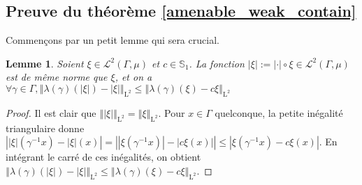 \documentclass[a4paper,12pt]{article}
\newtheorem{lemma}[theorem]{Lemme}
\newcommand{\norm}[1]{\left\Vert #1\right\Vert}
\newcommand{\abs}[1]{\left\vert#1\right\vert}
\newcommand{\inv}{^{-1}}
\newcommand{\comp}{\circ}
\begin{document}
\subsection{Preuve du théorème \ref{amenable_weak_contain}}

Commençons par un petit lemme qui sera crucial.

\begin{lemma}\label{abs_trick}
    Soient $\xi\in\mathscr{L}^2(\Gamma, \mu)$ et $c\in\mathbb{S}_1$. La fonction $\abs{\xi} := \abs{\cdot}\comp\xi \in\mathscr{L}^2(\Gamma, \mu)$ est de même norme 
    que $\xi$, et on a $\forall\gamma\in\Gamma, \norm{\lambda(\gamma)(\abs{\xi}) - \abs{\xi}}_{\mathrm{L}^2} \le \norm{\lambda(\gamma)(\xi) - c\xi}_{\mathrm{L}^2}$
\end{lemma}

\begin{proof}
    Il est clair que $\norm{\abs{\xi}}_{\mathrm{L}^2} = \norm{\xi}_{\mathrm{L}^2}$. Pour $x\in\Gamma$ quelconque, 
    la petite inégalité triangulaire donne $\abs{\abs{\xi}(\gamma\inv x) - \abs{\xi}(x)} = \abs{\abs{\xi(\gamma\inv x)} - \abs{c\xi(x)}} \leq \abs{\xi(\gamma\inv x) - c\xi(x)}$. En intégrant le carré de ces inégalités,
    on obtient $\norm{\lambda(\gamma)(\abs{\xi}) - \abs{\xi}}_{\mathrm{L}^2} \leq \norm{\lambda(\gamma)(\xi) - c\xi}_{\mathrm{L}^2}$.
\end{proof}
\end{document}
